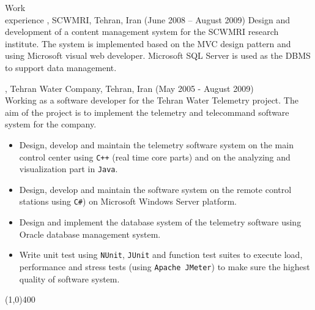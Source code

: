 \documentclass{resume}
\begin{document}
\begin{category}{Work \\experience}
, SCWMRI, Tehran, Iran (June 2008 – August 2009)
Design and development of a content management system for the SCWMRI research institute. 
The system is implemented based on the MVC design pattern and using Microsoft visual web developer. 
Microsoft SQL Server is used as the DBMS to support data management. 

, Tehran Water Company, Tehran, Iran (May 2005 - August 2009)\\
Working as a software developer for the Tehran Water Telemetry project. The aim of the 
project is to implement the telemetry and telecommand software system for the company.
\begin{itemize}
 \item Design, develop and maintain the telemetry software system on the main control center using 
       \texttt{C++} (real time core parts) and on the analyzing and visualization part in \texttt{Java}.
 \item Design, develop and maintain the software system on the remote control stations using \texttt{C\#})
       on Microsoft Windows Server platform.
 \item Design and implement the database system of the telemetry software 
       using Oracle database management system.
 \item Write unit test using \texttt{NUnit}, \texttt{JUnit} and function test 
       suites to execute load, performance and stress tests (using \texttt{Apache JMeter}) 
       to make sure the highest quality of software system.
\end{itemize}

\end{category}

\begin{center}
\line(1,0){400}
\end{center}


\end{document}
